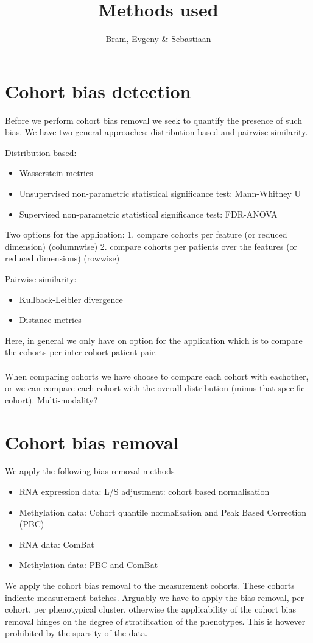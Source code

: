 \documentclass[a4paper,10pt]{article}
\title{Methods used}
\author{Bram, Evgeny \& Sebastiaan}
\begin{document}
\section{Cohort bias detection}
%
Before we perform cohort bias removal we seek to quantify the presence of such bias.
We have two general approaches: distribution based and pairwise similarity.

Distribution based: 
\begin{itemize}
 \item Wasserstein metrics
 \item Unsupervised non-parametric statistical significance test: Mann-Whitney U
 \item Supervised non-parametric statistical significance test: FDR-ANOVA
\end{itemize}
%
Two options for the application:
1. compare cohorts per feature (or reduced dimension) (columnwise)
2. compare cohorts per patients over the features (or reduced dimensions) (rowwise)

Pairwise similarity:
\begin{itemize}
 \item Kullback-Leibler divergence
 \item Distance metrics 
\end{itemize}
%
Here, in general we only have on option for the application which is to compare the cohorts per inter-cohort patient-pair.\\\\
When comparing cohorts we have choose to compare each cohort with eachother, or we can compare each cohort with the overall distribution (minus that specific cohort).
%
Multi-modality? 
%
\section{Cohort bias removal}
%
We apply the following bias removal methods
%
\begin{itemize}
\item RNA expression data: L/S adjustment: cohort based normalisation
\item Methylation data: Cohort quantile normalisation and Peak Based Correction (PBC)
\item RNA data: ComBat 
\item Methylation data: PBC and ComBat
\end{itemize}

We apply the cohort bias removal to the measurement cohorts. These cohorts indicate measurement batches.
%
Arguably we have to apply the bias removal, per cohort, per phenotypical cluster, otherwise
the applicability of the cohort bias removal hinges on the degree of stratification of the phenotypes.
This is however prohibited by the sparsity of the data.
\end{document}

